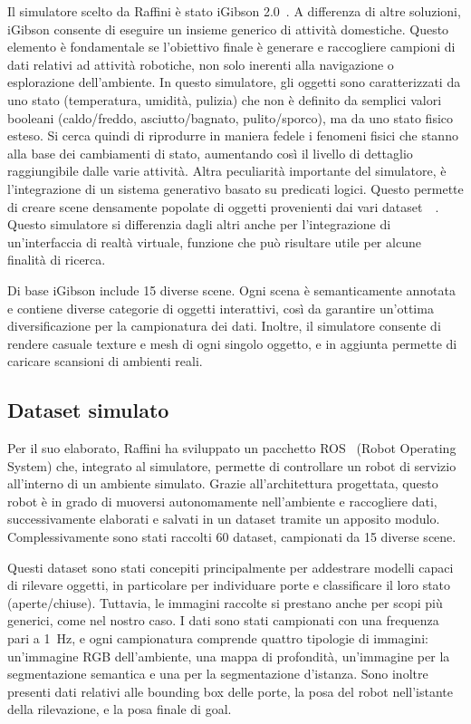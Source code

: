 \documentclass[12pt]{report}
\begin{document}
Il simulatore scelto da Raffini è stato iGibson 2.0~\cite{li2021igibson}. A differenza di altre soluzioni, iGibson consente di eseguire un insieme generico di attività domestiche. Questo elemento è fondamentale se l'obiettivo finale è generare e raccogliere campioni di dati relativi ad attività robotiche, non solo inerenti alla navigazione o esplorazione dell'ambiente. In questo simulatore, gli oggetti sono caratterizzati da uno stato (temperatura, umidità, pulizia) che non è definito da semplici valori booleani (caldo/freddo, asciutto/bagnato, pulito/sporco), ma da uno stato fisico esteso. Si cerca quindi di riprodurre in maniera fedele i fenomeni fisici che stanno alla base dei cambiamenti di stato, aumentando così il livello di dettaglio raggiungibile dalle varie attività. Altra peculiarità importante del simulatore, è l'integrazione di un sistema generativo basato su predicati logici. Questo permette di creare scene densamente popolate di oggetti provenienti dai vari dataset~\cite{doi:10.1177/0278364919844314}~\cite{pmlr-v164-srivastava22a}. Questo simulatore si differenzia dagli altri anche per l'integrazione di un'interfaccia di realtà virtuale, funzione che può risultare utile per alcune finalità di ricerca.

Di base iGibson include 15 diverse scene. Ogni scena è semanticamente annotata e contiene diverse categorie di oggetti interattivi, così da garantire un'ottima diversificazione per la campionatura dei dati. Inoltre, il simulatore consente di rendere casuale texture e mesh di ogni singolo oggetto, e in aggiunta permette di caricare scansioni di ambienti reali.

\subsection{Dataset simulato}
\label{sec:dataset_simulato}

Per il suo elaborato, Raffini ha sviluppato un pacchetto ROS~\cite{quigley2009ros} (Robot Operating System) che, integrato al simulatore, permette di controllare un robot di servizio all'interno di un ambiente simulato. Grazie all'architettura progettata, questo robot è in grado di muoversi autonomamente nell'ambiente e raccogliere dati, successivamente elaborati e salvati in un dataset tramite un apposito modulo. Complessivamente sono stati raccolti 60 dataset, campionati da 15 diverse scene.

Questi dataset sono stati concepiti principalmente per addestrare modelli capaci di rilevare oggetti, in particolare per individuare porte e classificare il loro stato (aperte/chiuse). Tuttavia, le immagini raccolte si prestano anche per scopi più generici, come nel nostro caso. I dati sono stati campionati con una frequenza pari a \SI{1}{\hertz}, e ogni campionatura comprende quattro tipologie di immagini: un'immagine RGB dell'ambiente, una mappa di profondità, un'immagine per la segmentazione semantica e una per la segmentazione d'istanza. Sono inoltre presenti dati relativi alle bounding box delle porte, la posa del robot nell'istante della rilevazione, e la posa finale di goal.
\end{document}
